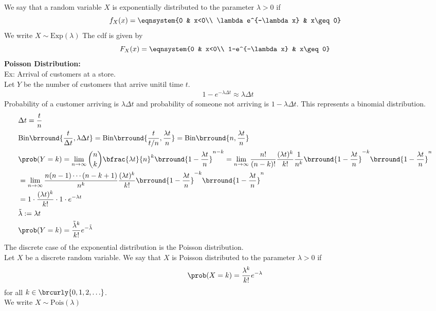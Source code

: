 We say that a random variable $X$ is exponentially distributed to the parameter $\lambda>0$ if
\[f_X(x)=\eqnsystem{0 & x<0\\ \lambda e^{-\lambda x} & x\geq 0}\]
We write $X\sim\mathrm{Exp}(\lambda)$
The cdf is given by
\[F_X(x)=\eqnsystem{0 & x<0\\ 1-e^{-\lambda x} & x\geq 0}\]
\textbf{Poisson Distribution:}\\
Ex: Arrival of customers at a store.\\
Let $Y$ be the number of customers that arrive unitil time $t$.
\begin{align*}
    &1-e^{-\lambda\Delta t}\approx\lambda\Delta t
\end{align*}
Probability of a customer arriving is $\lambda\Delta t$ and probability of someone not arriving is $1-\lambda\Delta t$. This represents a binomial distribution.
\begin{align*}
    &\Delta t=\frac{t}{n}\\
    &\mathrm{Bin}\brround{\frac{t}{\Delta t},\lambda\Delta t}=\mathrm{Bin}\brround{\frac{t}{t/n},\frac{\lambda t}{n}}=\mathrm{Bin}\brround{n,\frac{\lambda t}{n}}\\
    &\prob(Y=k)=\lim_{n\to\infty}\binom{n}{k}\bfrac{\lambda t}{n}^k\brround{1-\frac{\lambda t}{n}}^{n-k}=\lim_{n\to\infty}\frac{n!}{(n-k)!}\frac{(\lambda t)^k}{k!}\frac{1}{n^k}\brround{1-\frac{\lambda t}{n}}^{-k}\brround{1-\frac{\lambda t}{n}}^n\\
    &=\lim_{n\to\infty}\frac{n(n-1)\cdots(n-k+1)}{n^k}\frac{(\lambda t)^k}{k!}\brround{1-\frac{\lambda t}{n}}^{-k}\brround{1-\frac{\lambda t}{n}}^n\\
    &=1\cdot\frac{(\lambda t)^k}{k!}\cdot 1\cdot e^{-\lambda t}\\
    &\tilde{\lambda}:=\lambda t\\
    &\prob(Y=k)=\frac{\tilde{\lambda}^k}{k!}e^{-\tilde{\lambda}}
\end{align*}
The discrete case of the exponential distribution is the Poisson distribution.\\
Let $X$ be a discrete random variable. We say that $X$ is Poisson distributed to the parameter $\lambda>0$ if
\[\prob(X=k)=\frac{\lambda^k}{k!}e^{-\lambda}\]
for all $k\in\brcurly{0,1,2,\ldots}$.\\
We write $X\sim\mathrm{Pois}(\lambda)$


